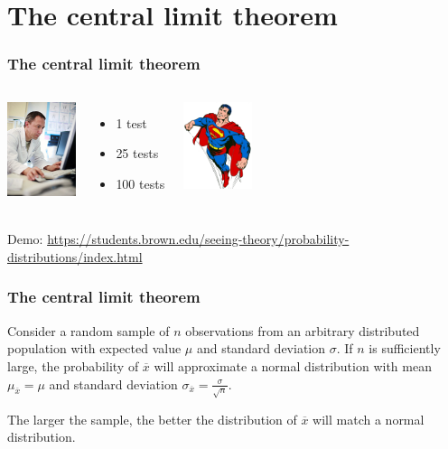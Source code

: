 \documentclass{beamer}
\begin{document}
\section{The central limit theorem}
\sectionframelogo{}

\begin{frame}
  \frametitle{The central limit theorem}


  \vfill

  \begin{columns}[c]
    \includegraphics[width=2cm]{img/les4-centrlimiet}
    \begin{itemize}
      \item 1 test
      \item 25 tests
      \item 100 tests
    \end{itemize}
    \includegraphics[width=2cm]{img/les2-hero-3}
  \end{columns}

\vfill
Demo: \url{https://students.brown.edu/seeing-theory/probability-distributions/index.html}

\end{frame}

\begin{frame}
  \frametitle{The central limit theorem}

  Consider a random sample of $n$ observations from an arbitrary distributed population with expected value $\mu$ and standard deviation $\sigma$. If $n$ is sufficiently large, the probability of $\overline{x}$ will approximate a normal distribution with mean $\mu_{\overline{x}} = \mu$ and standard deviation $\sigma_{\overline{x}} = \frac{\sigma}{\sqrt{n}}$.

\vspace{0.4cm}
  The larger the sample, the better the distribution of $\overline{x}$ will match a normal distribution.
\end{frame}
\end{document}
